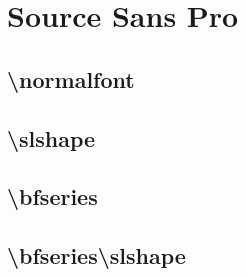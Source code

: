 \documentclass[danish,a4paper,11pt]{scrartcl}
\begin{document}
\section*{Source Sans Pro}
\subsection*{\textbackslash normalfont}
\normalfont\normalfont

\subsection*{\textbackslash slshape}
\normalfont\slshape

\subsection*{\textbackslash bfseries}
\normalfont\bfseries

\subsection*{\textbackslash bfseries\textbackslash slshape}
\normalfont\bfseries\slshape

\newpage
\normalfont\normalfont

\end{document}
